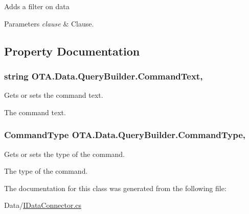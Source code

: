 Adds a filter on data 


\begin{DoxyParams}{Parameters}
{\em clause} & Clause.\\
\hline
\end{DoxyParams}


\subsection{Property Documentation}
\hypertarget{class_o_t_a_1_1_data_1_1_query_builder_a1eadb38554f8f97ae346e4d7c3517d82}{}
\subsubsection[{Command\+Text}]{\setlength{\rightskip}{0pt plus 5cm}string O\+T\+A.\+Data.\+Query\+Builder.\+Command\+Text\hspace{0.3cm}{\ttfamily [get]}, {\ttfamily [set]}}\label{class_o_t_a_1_1_data_1_1_query_builder_a1eadb38554f8f97ae346e4d7c3517d82}


Gets or sets the command text. 

The command text.\hypertarget{class_o_t_a_1_1_data_1_1_query_builder_a8ccaa717afcb77ce6fcd6694f8282727}{}
\subsubsection[{Command\+Type}]{\setlength{\rightskip}{0pt plus 5cm}Command\+Type O\+T\+A.\+Data.\+Query\+Builder.\+Command\+Type\hspace{0.3cm}{\ttfamily [get]}, {\ttfamily [set]}}\label{class_o_t_a_1_1_data_1_1_query_builder_a8ccaa717afcb77ce6fcd6694f8282727}


Gets or sets the type of the command. 

The type of the command.

The documentation for this class was generated from the following file\+:\begin{DoxyCompactItemize}
\item 
Data/\hyperlink{_i_data_connector_8cs}{I\+Data\+Connector.\+cs}\end{DoxyCompactItemize}

